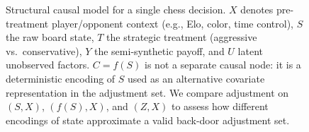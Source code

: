 \documentclass[11pt]{article}
\begin{document}
\begin{figure}[t]
\centering
{}
\caption{Structural causal model for a single chess decision.
$X$ denotes pre-treatment player/opponent context (e.g., Elo, color, time control),
$S$ the raw board state, $T$ the strategic treatment (aggressive vs.\ conservative),
$Y$ the semi-synthetic payoff, and $U$ latent unobserved factors.
$C = f(S)$ is not a separate causal node: it is a deterministic encoding of $S$
used as an alternative covariate representation in the adjustment set.
We compare adjustment on $(S, X)$, $(f(S), X)$, and $(Z, X)$ to assess
how different encodings of state approximate a valid back-door adjustment set.}
\label{fig:scm_chess}
\end{figure}



\end{document}
